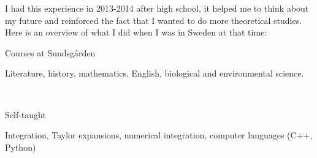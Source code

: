 \documentclass[a4paper,10pt]{article}
\begin{document}
	I had this experience in 2013-2014 after high school, it helped me to think about my future and reinforced the fact that I wanted to do more theoretical studies. Here is an overview of what I did when I was in Sweden at that time:
	\vspace{3mm}
	
	\noindent
	\begin{minipage}{0.25\textwidth}
		\color{MyGray} Courses at Sundsgården
	\end{minipage}
	\hfill
	\begin{minipage}{0.70\textwidth}
		Literature, history, mathematics, English, biological and environmental science.
	\end{minipage}\\
	\vspace{2mm}
	
	\noindent
	\begin{minipage}{0.25\textwidth}
		\color{MyGray} Self-taught
	\end{minipage}
	\hfill
	\begin{minipage}{0.70\textwidth}
		Integration, Taylor expansions, numerical integration, computer languages (C++, Python)
	\end{minipage}\\
	\vspace{2mm}
	
\end{document}
